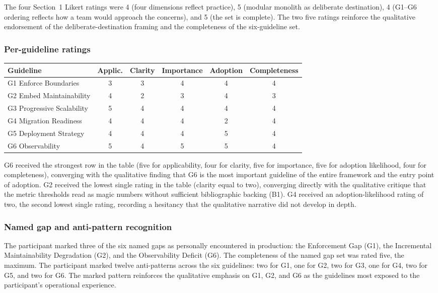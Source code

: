 The four Section~1 Likert ratings were 4 (four dimensions reflect practice), 5 (modular monolith as deliberate destination), 4 (G1--G6 ordering reflects how a team would approach the concerns), and 5 (the set is complete). The two five ratings reinforce the qualitative endorsement of the deliberate-destination framing and the completeness of the six-guideline set.

\subsubsection*{Per-guideline ratings}

\begin{longtable}{p{2.5cm} c c c c c}
\toprule
\textbf{Guideline} & \textbf{Applic.} & \textbf{Clarity} & \textbf{Importance} & \textbf{Adoption} & \textbf{Completeness} \\
\midrule
\endhead
G1 Enforce Boundaries & 3 & 3 & 4 & 4 & 4 \\
G2 Embed Maintainability & 4 & 2 & 3 & 4 & 3 \\
G3 Progressive Scalability & 5 & 4 & 4 & 4 & 4 \\
G4 Migration Readiness & 4 & 4 & 4 & 2 & 4 \\
G5 Deployment Strategy & 4 & 4 & 4 & 5 & 4 \\
G6 Observability & 5 & 4 & 5 & 5 & 4 \\
\bottomrule
\end{longtable}

\noindent
G6 received the strongest row in the table (five for applicability, four for clarity, five for importance, five for adoption likelihood, four for completeness), converging with the qualitative finding that G6 is the most important guideline of the entire framework and the entry point of adoption. G2 received the lowest single rating in the table (clarity equal to two), converging directly with the qualitative critique that the metric thresholds read as magic numbers without sufficient bibliographic backing (B1). G4 received an adoption-likelihood rating of two, the second lowest single rating, recording a hesitancy that the qualitative narrative did not develop in depth.

\subsubsection*{Named gap and anti-pattern recognition}

The participant marked three of the six named gaps as personally encountered in production: the Enforcement Gap (G1), the Incremental Maintainability Degradation (G2), and the Observability Deficit (G6). The completeness of the named gap set was rated five, the maximum. The participant marked twelve anti-patterns across the six guidelines: two for G1, one for G2, two for G3, one for G4, two for G5, and two for G6. The marked pattern reinforces the qualitative emphasis on G1, G2, and G6 as the guidelines most exposed to the participant's operational experience.

